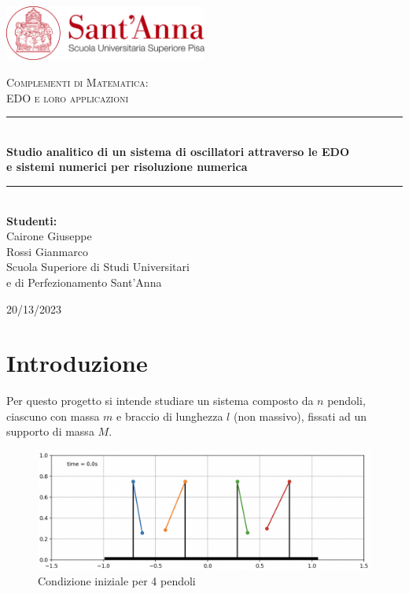 \documentclass[12pt]{article}
\newcommand{\HRule}{\rule{\linewidth}{0.5mm}}
\begin{document}

\begin{titlepage}
  \begin{center}
    \includegraphics[width=0.5\textwidth]{figures/logo.png}~\\[1cm]

    \vspace{3cm}

    \textsc{\Large Complementi di Matematica: \\ EDO e loro applicazioni}\\[3cm]


    \HRule \\[0.4cm]
    {\large \bfseries Studio analitico di un sistema di oscillatori attraverso le EDO \\ e sistemi numerici per risoluzione numerica \\ [0.4cm]}
    \HRule \\[4cm]

    \large\textbf{Studenti:}\\
    Cairone Giuseppe \\ Rossi Gianmarco \\ Scuola Superiore di Studi Universitari \\ e di Perfezionamento Sant'Anna\\[3cm]

    \vfill

    {\large 20/13/2023}

  \end{center}
\end{titlepage}

\newpage

\tableofcontents

\newpage

\section{Introduzione}

Per questo progetto si intende studiare un sistema composto da $n$ pendoli, ciascuno con massa $m$ e braccio di lunghezza $l$ (non massivo), fissati ad un supporto di massa $M$.

\begin{figure}[htp!]
  \centering
  \includegraphics[width=.7\textwidth]{figures/fig_pendoli.png}
  \caption{Condizione iniziale per 4 pendoli}
  \label{fig:pendoli_start}
\end{figure}
\end{document}
